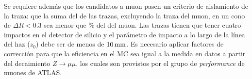 
Se requiere además que los candidatos a muon pasen un criterio de aislamiento de
la traza: que la suma del {\pt} de las trazas, excluyendo la traza del muon, en
un cono de $\Delta R < 0.3$ sea menor que \unit[12]{\%} del {\pt} del muon. Las
trazas tienen que tener cuatro impactos en el detector de silicio y el parámetro
de impacto a lo largo de la línea del haz ($z_{0}$) debe ser de menos de
$\unit[10]{mm}$.
Es necesario aplicar factores de corrección para que la eficiencia en el MC
sea igual a la medida en datos a partir del decaimiento $Z\to\mu\mu$, los
cuales son provistos por el grupo de \emph{performance} de muones de ATLAS.



